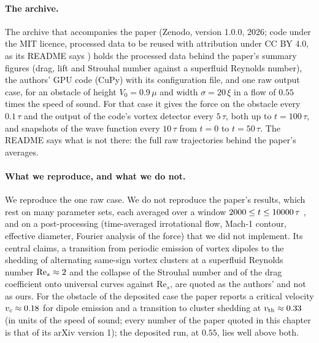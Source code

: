 \paragraph{The archive.} The archive that accompanies the paper (Zenodo, version 1.0.0, 2026; code under the MIT licence, processed data to be reused with attribution under CC BY 4.0, as its README says \cite{KwonShin2026data}) holds the processed data behind the paper's summary figures (drag, lift and Strouhal number against a superfluid Reynolds number), the authors' GPU code (CuPy) with its configuration file, and one raw output case, for an obstacle of height $V_0=0.9\,\mu$ and width $\sigma=20\,\xi$ in a flow of $0.55$ times the speed of sound. For that case it gives the force on the obstacle every $0.1\,\tau$ and the output of the code's vortex detector every $5\,\tau$, both up to $t=100\,\tau$, and snapshots of the wave function every $10\,\tau$ from $t=0$ to $t=50\,\tau$. The README says what is not there: the full raw trajectories behind the paper's averages.

\paragraph{What we reproduce, and what we do not.} We reproduce the one raw case. We do not reproduce the paper's results, which rest on many parameter sets, each averaged over a window $2000\le t\le10000\,\tau$ \cite{KwonShin2026prr}, and on a post-processing (time-averaged irrotational flow, Mach-1 contour, effective diameter, Fourier analysis of the force) that we did not implement. Its central claims, a transition from periodic emission of vortex dipoles to the shedding of alternating same-sign vortex clusters at a superfluid Reynolds number $\mathrm{Re}_s\approx2$ and the collapse of the Strouhal number and of the drag coefficient onto universal curves against $\mathrm{Re}_s$, are quoted as the authors' and not as ours. For the obstacle of the deposited case the paper reports a critical velocity $v_c\approx0.18$ for dipole emission and a transition to cluster shedding at $v_{\rm th}\approx0.33$ (in units of the speed of sound; every number of the paper quoted in this chapter is that of its arXiv version 1); the deposited run, at $0.55$, lies well above both.

